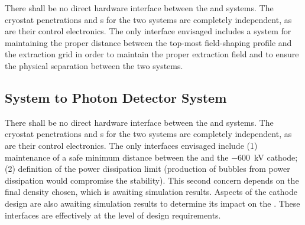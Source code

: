 There shall be no direct hardware interface between the \hv and  systems. The cryostat penetrations and \fdth{}s for the two systems are completely independent, as are their control electronics. The only interface envisaged includes a system for maintaining the proper distance between the top-most field-shaping profile and the extraction grid in order to maintain the proper extraction field and to ensure the physical separation between the two systems. 

\subsection{System to Photon Detector System}
\label{sec:fddp-hv-intfc-to-pds}


There shall be no direct hardware interface between the \hv and  systems. The cryostat penetrations and \fdth{}s for the two systems are completely independent, as are their control electronics. The only interfaces envisaged include (1) maintenance of a safe minimum distance between the  and the \SI{-600}{\kV} cathode; (2)
 definition of the  power dissipation limit (production of bubbles from power dissipation would compromise the \hv stability). This second concern depends on the final  density chosen, which is awaiting simulation results. Aspects of the cathode design are also awaiting simulation results to determine its impact on the . 
These interfaces are effectively at the level of design requirements. 
%
%
%
%
%
%
%
%
%
%
